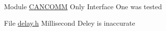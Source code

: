 
\begin{DoxyRefList}
\item[Module \mbox{\hyperlink{group___c_a_n_c_o_m_m}{CANCOMM}} ]\label{bug__bug000001}%
%
Only Interface One was tested 
\item[File \mbox{\hyperlink{delay_8h}{delay.h}} ]\label{bug__bug000002}%
%
Millisecond Deley is inaccurate
\end{DoxyRefList}
